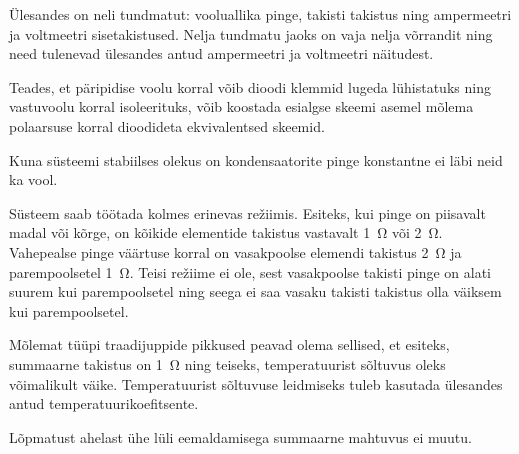 \documentclass[10pt]{article}
\begin{document}
{
\hint
Ülesandes on neli tundmatut: vooluallika pinge, takisti takistus ning ampermeetri ja voltmeetri sisetakistused. Nelja tundmatu jaoks on vaja nelja võrrandit ning need tulenevad ülesandes antud ampermeetri ja voltmeetri näitudest.
\probend
\bigskip


\hint
Teades, et päripidise voolu korral võib dioodi klemmid lugeda lühistatuks ning vastuvoolu korral isoleerituks, võib koostada esialgse skeemi asemel mõlema polaarsuse korral dioodideta ekvivalentsed skeemid.
\probend
\bigskip


\hint
Kuna süsteemi stabiilses olekus on kondensaatorite pinge konstantne ei läbi neid ka vool.
\probend
\bigskip


\hint
Süsteem saab töötada kolmes erinevas režiimis. Esiteks, kui pinge on piisavalt madal või kõrge, on kõikide elementide takistus vastavalt \SI{1}{\ohm} või \SI{2}{\ohm}. Vahepealse pinge väärtuse korral on vasakpoolse elemendi takistus \SI{2}{\ohm} ja parempoolsetel \SI{1}{\ohm}. Teisi režiime ei ole, sest vasakpoolse takisti pinge on alati suurem kui parempoolsetel ning seega ei saa vasaku takisti takistus olla väiksem kui parempoolsetel.
\probend
\bigskip


\hint
Mõlemat tüüpi traadijuppide pikkused peavad olema sellised, et esiteks, summaarne takistus on \SI{1}{\ohm} ning teiseks, temperatuurist sõltuvus oleks võimalikult väike. Temperatuurist sõltuvuse leidmiseks tuleb kasutada ülesandes antud temperatuurikoefitsente.
\probend
\bigskip


\hint
Lõpmatust ahelast ühe lüli eemaldamisega summaarne mahtuvus ei muutu.
\probend
\bigskip

}
\end{document}
